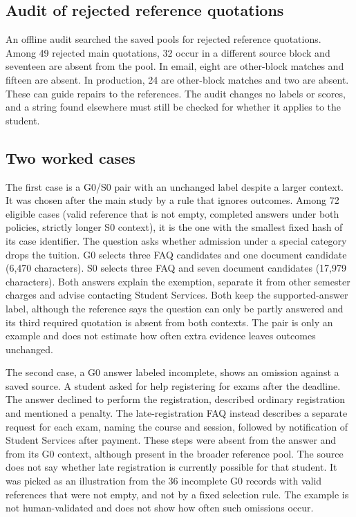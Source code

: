 \subsection{Audit of rejected reference quotations}
\label{sec:quote-audit}

An offline audit searched the saved pools for rejected reference quotations. Among 49 rejected main quotations, 32 occur in a different source block and seventeen are absent from the pool. In email, eight are other-block matches and fifteen are absent. In production, 24 are other-block matches and two are absent. These can guide repairs to the references. The audit changes no labels or scores, and a string found elsewhere must still be checked for whether it applies to the student.

\subsection{Two worked cases}
\label{sec:illustrations}

The first case is a G0/S0 pair with an unchanged label despite a larger context. It was chosen after the main study by a rule that ignores outcomes. Among 72 eligible cases (valid reference that is not empty, completed answers under both policies, strictly longer S0 context), it is the one with the smallest fixed hash of its case identifier. The question asks whether admission under a special category drops the tuition. G0 selects three FAQ candidates and one document candidate (6,470 characters). S0 selects three FAQ and seven document candidates (17,979 characters). Both answers explain the exemption, separate it from other semester charges and advise contacting Student Services. Both keep the supported-answer label, although the reference says the question can only be partly answered and its third required quotation is absent from both contexts. The pair is only an example and does not estimate how often extra evidence leaves outcomes unchanged.

The second case, a G0 answer labeled incomplete, shows an omission against a saved source. A student asked for help registering for exams after the deadline. The answer declined to perform the registration, described ordinary registration and mentioned a penalty. The late-registration FAQ instead describes a separate request for each exam, naming the course and session, followed by notification of Student Services after payment. These steps were absent from the answer and from its G0 context, although present in the broader reference pool. The source does not say whether late registration is currently possible for that student. It was picked as an illustration from the 36 incomplete G0 records with valid references that were not empty, and not by a fixed selection rule. The example is not human-validated and does not show how often such omissions occur.

